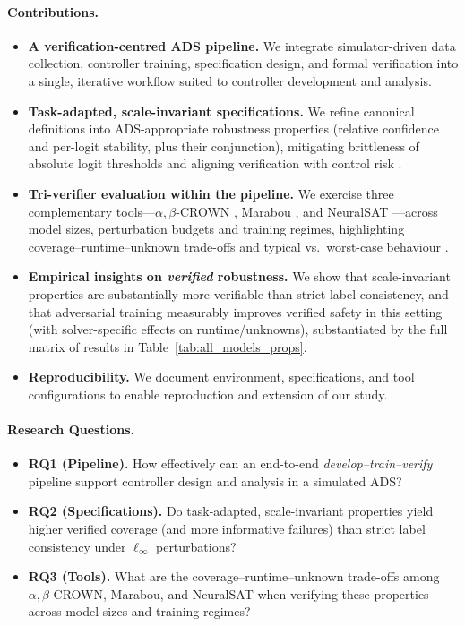 \paragraph{Contributions.}
\begin{itemize}
  \item \textbf{A verification-centred ADS pipeline.} We integrate simulator-driven data collection, controller training, specification design, and formal verification into a single, iterative workflow suited to controller development and analysis.
  \item \textbf{Task-adapted, scale-invariant specifications.} We refine canonical definitions into ADS-appropriate robustness properties (relative confidence and per-logit stability, plus their conjunction), mitigating brittleness of absolute logit thresholds and aligning verification with control risk \cite{casadio2022neural}.
  \item \textbf{Tri-verifier evaluation within the pipeline.} We exercise three complementary tools—$\alpha,\beta$-CROWN \cite{zhang2018efficient, xu2021fast, wang2021beta, zhou2024scalable}, Marabou \cite{katz2019marabou}, and NeuralSAT \cite{duong2024dpllt}—across model sizes, perturbation budgets and training regimes, highlighting coverage–runtime–unknown trade-offs and typical vs.\ worst-case behaviour \cite{bak2021second, brix2023fourth}.
  \item \textbf{Empirical insights on \emph{verified} robustness.} We show that scale-invariant properties are substantially more verifiable than strict label consistency, and that adversarial training measurably improves verified safety in this setting (with solver-specific effects on runtime/unknowns), substantiated by the full matrix of results in Table~\ref{tab:all_models_props}.
  \item \textbf{Reproducibility.} We document environment, specifications, and tool configurations to enable reproduction and extension of our study.
\end{itemize}

\paragraph{Research Questions.}
\begin{itemize}
  \item \textbf{RQ1 (Pipeline).} How effectively can an end-to-end \emph{develop–train–verify} pipeline support controller design and analysis in a simulated ADS?
  \item \textbf{RQ2 (Specifications).} Do task-adapted, scale-invariant properties yield higher verified coverage (and more informative failures) than strict label consistency under $\ell_\infty$ perturbations?
  \item \textbf{RQ3 (Tools).} What are the coverage–runtime–unknown trade-offs among $\alpha,\beta$-CROWN, Marabou, and NeuralSAT when verifying these properties across model sizes and training regimes?
\end{itemize}
